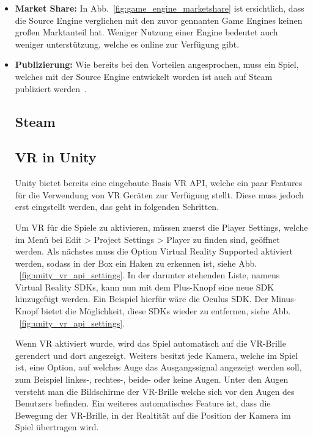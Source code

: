 \begin{itemize}
    \item \textbf{Market Share:} In Abb.~\ref{fig:game_engine_marketshare} ist ersichtlich, dass die Source Engine verglichen mit den zuvor gennanten Game Engines keinen großen Marktanteil hat.
    Weniger Nutzung einer Engine bedeutet auch weniger unterstützung, welche es online zur Verfügung gibt.
    \item \textbf{Publizierung:} Wie bereits bei den Vorteilen angesprochen, muss ein Spiel, welches mit der Source Engine entwickelt worden ist auch auf Steam publiziert werden~\cite{Brenna_Hillier_2015}.

\subsection{Steam}\label{subsec:steam}

\subsection{VR in Unity}
Unity bietet bereits eine eingebaute Basis VR API, welche ein paar Features für die Verwendung von VR Geräten zur Verfügung stellt.
Diese muss jedoch erst eingstellt werden, das geht in folgenden Schritten.

Um VR für die Spiele zu aktivieren, müssen zuerst die Player Settings, welche im Menü bei Edit > Project Settings > Player zu finden sind, geöffnet werden.
Als nächstes muss die Option Virtual Reality Supported aktiviert werden, sodass in der Box ein Haken zu erkennen ist, siehe Abb. ~\ref{fig:unity_vr_api_settings}.
In der darunter stehenden Liste, namens Virtual Reality SDKs, kann nun mit dem Plus-Knopf eine neue SDK hinzugefügt werden.
Ein Beispiel hierfür wäre die Oculus SDK.
Der Minus-Knopf bietet die Möglichkeit, diese SDKs wieder zu entfernen, siehe Abb. ~\ref{fig:unity_vr_api_settings}.
~\cite{Unity_VR_Overview_2022}

Wenn VR aktiviert wurde, wird das Spiel automatisch auf die VR-Brille gerendert und dort angezeigt.
Weiters besitzt jede Kamera, welche im Spiel ist, eine Option, auf welches Auge das Ausgangssignal angezeigt werden soll, zum Beispiel linkes-, rechtes-, beide- oder keine Augen.
Unter den Augen versteht man die Bildschirme der VR-Brille welche sich vor den Augen des Benutzers befinden.
Ein weiteres automatisches Feature ist, dass die Bewegung der VR-Brille, in der Realtität auf die Position der Kamera im Spiel übertragen wird.


\end{itemize}
